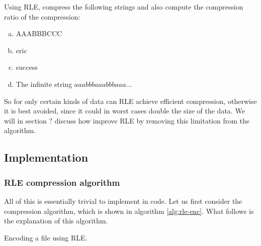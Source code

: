 \begin{Exercise}[label={rle-compression}]
  Using RLE, compress the following strings and also compute the
  compression ratio of the compression:

  \begin{enumerate}[(a)]
  \item AAABBBCCC
  \item eric
  \item success
  \item The infinite string $aaabbbaaabbbaaa\dots$
  \end{enumerate}

\end{Exercise}

So for only certain kinds of data can RLE achieve efficient
compression, otherwise it is best avoided, since it could in worst
cases double the size of the data. We will in section ? discuss how
improve RLE by removing this limitation from the algorithm.

\subsection{Implementation}

\subsubsection{RLE compression algorithm}

All of this is essentially trivial to implement in code. Let us first
consider the compression algorithm, which is shown in algorithm
\ref{alg:rle-enc}. What follows is the explanation of this algorithm.

\begin{algorithm}
  \caption{Encoding a file using RLE.}
  \label{alg:rle-enc}
  \begin{algorithmic}[1]


    \While{\True}


      \If{\eof}
        \Break
      \EndIf

      \Else
        \State {}
        \State {}

      \EndIf

    \EndWhile

    \State {}
    \State {}
  \end{algorithmic}
\end{algorithm}

